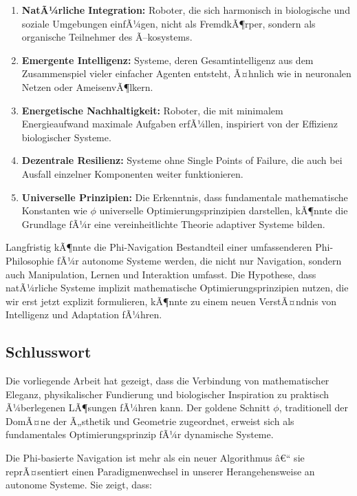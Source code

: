 ﻿\documentclass[a4paper,12pt]{article}
\theoremstyle{definition}
\begin{document}
\begin{enumerate}
	\item \textbf{NatÃ¼rliche Integration:} Roboter, die sich harmonisch in biologische und soziale Umgebungen einfÃ¼gen, nicht als FremdkÃ¶rper, sondern als organische Teilnehmer des Ã–kosystems.
	
	\item \textbf{Emergente Intelligenz:} Systeme, deren Gesamtintelligenz aus dem Zusammenspiel vieler einfacher Agenten entsteht, Ã¤hnlich wie in neuronalen Netzen oder AmeisenvÃ¶lkern.
	
	\item \textbf{Energetische Nachhaltigkeit:} Roboter, die mit minimalem Energieaufwand maximale Aufgaben erfÃ¼llen, inspiriert von der Effizienz biologischer Systeme.
	
	\item \textbf{Dezentrale Resilienz:} Systeme ohne Single Points of Failure, die auch bei Ausfall einzelner Komponenten weiter funktionieren.
	
	\item \textbf{Universelle Prinzipien:} Die Erkenntnis, dass fundamentale mathematische Konstanten wie $\phi$ universelle Optimierungsprinzipien darstellen, kÃ¶nnte die Grundlage fÃ¼r eine vereinheitlichte Theorie adaptiver Systeme bilden.
\end{enumerate}

Langfristig kÃ¶nnte die Phi-Navigation Bestandteil einer umfassenderen Phi-Philosophie fÃ¼r autonome Systeme werden, die nicht nur Navigation, sondern auch Manipulation, Lernen und Interaktion umfasst. Die Hypothese, dass natÃ¼rliche Systeme implizit mathematische Optimierungsprinzipien nutzen, die wir erst jetzt explizit formulieren, kÃ¶nnte zu einem neuen VerstÃ¤ndnis von Intelligenz und Adaptation fÃ¼hren.

\subsection{Schlusswort}

Die vorliegende Arbeit hat gezeigt, dass die Verbindung von mathematischer Eleganz, physikalischer Fundierung und biologischer Inspiration zu praktisch Ã¼berlegenen LÃ¶sungen fÃ¼hren kann. Der goldene Schnitt $\phi$, traditionell der DomÃ¤ne der Ã„sthetik und Geometrie zugeordnet, erweist sich als fundamentales Optimierungsprinzip fÃ¼r dynamische Systeme.

Die Phi-basierte Navigation ist mehr als ein neuer Algorithmus â€“ sie reprÃ¤sentiert einen Paradigmenwechsel in unserer Herangehensweise an autonome Systeme. Sie zeigt, dass:
\end{document}
